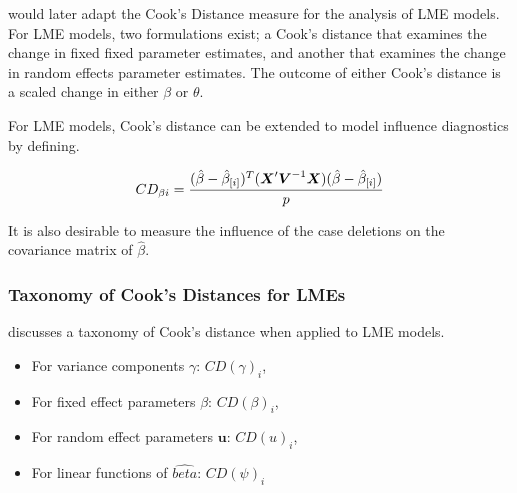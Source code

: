 \documentclass[12pt, a4paper]{report}
\theoremstyle{plain}
\theoremstyle{definition}
\theoremstyle{remark}
\begin{document}
	\citet{Christensen} would later adapt the Cook's Distance measure for the analysis of LME models. For LME models, two formulations exist; a Cook's distance that examines the change in fixed fixed parameter estimates, and another that examines the change in random effects parameter estimates. The outcome of either Cook's distance is a scaled change in either $\beta$ or $\theta$.

	
		For LME models, Cook's distance can be extended to model influence diagnostics by defining.
		
		\[ CD_{\beta i} = {(\hat{\beta} - \hat{\beta}_{[i]})^{T}(\boldsymbol{X}^{\prime}\boldsymbol{V}^{-1}\boldsymbol{X}) (\hat{\beta} - \hat{\beta}_{[i]}) \over p}\]
		
		It is also desirable to measure the influence of the case deletions on the covariance matrix of $\hat{\beta}$.
		




	\subsubsection{Taxonomy of Cook's Distances for LMEs}
	\citet{schabenberger} discusses a taxonomy of Cook's distance when applied to LME models. \begin{itemize}
		\item For variance components $\gamma$: $CD(\gamma)_i$,
		\item For fixed effect parameters $\beta$: $CD(\beta)_i$,
		\item For random effect parameters $\boldsymbol{u}$: $CD(u)_i$,
		\item For linear functions of $\hat{beta}$: $CD(\psi)_i$
	\end{itemize}			
\end{document}
